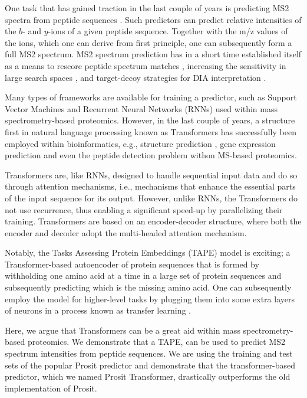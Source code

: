 \documentclass[10pt,a4paper]{article}
\begin{document}
One task that has gained traction in the last couple of years is predicting MS2 spectra from peptide sequences \cite{Degroeve2015-fh,Gessulat2019-el}. Such predictors can predict relative intensities of the $b$- and $y$-ions of a given peptide sequence. Together with the m/z values of the ions, which one can derive from first principle, one can subsequently form a full MS2 spectrum. MS2 spectrum prediction has in a short time established itself as a means to rescore peptide spectrum matches \cite{C_Silva2019-ja}, increasing the sensitivity in large search spaces \cite{Wilhelm2021-mz}, and target-decoy strategies for DIA interpretation \cite{Searle2020-yk}.

Many types of frameworks are available for training a predictor, such as Support Vector Machines and Recurrent Neural Networks (RNNs) used within mass spectrometry-based proteomics. However, in the last couple of years, a structure first in natural language processing \cite{devlin2018bert} known as Transformers \cite{Vaswani2017-sy} has successfully been employed within bioinformatics, e.g., structure prediction \cite{Rao2019-qq,Bepler2021-ci}, gene expression prediction\cite{avsec2021effective} and even the peptide detection problem withon MS-based proteomics\cite{cheng2021pepformer}.

Transformers are, like RNNs, designed to handle sequential input data and do so through attention mechanisms, i.e., mechanisms that enhance the essential parts of the input sequence for its output. However, unlike RNNs, the Transformers do not use recurrence, thus enabling a significant speed-up by parallelizing their training. Transformers are based on an encoder-decoder structure, where both the encoder and decoder adopt the multi-headed attention mechanism\cite{Vaswani2017-sy}.

Notably, the Tasks Assessing Protein Embeddings (TAPE) model \cite{Rao2019-qq} is exciting; a Transformer-based autoencoder of protein sequences that is formed by withholding one amino acid at a time in a large set of protein sequences and subsequently predicting which is the missing amino acid. One can subsequently employ the model for higher-level tasks by plugging them into some extra layers of neurons in a process known as transfer learning \cite{Rao2019-qq,Bepler2021-ci}.

Here, we argue that Transformers can be a great aid within mass spectrometry-based proteomics. We demonstrate that a TAPE, can be used to predict MS2 spectrum intensities from peptide sequences. We are using the training and test sets of the popular Prosit \cite{Gessulat2019-el} predictor and demonstrate that the transformer-based predictor, which we named Prosit Transformer, drastically outperforms the old implementation of Prosit.
\end{document}

